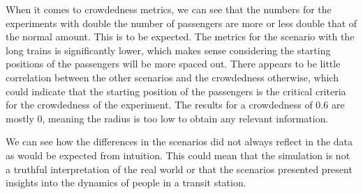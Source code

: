 When it comes to crowdedness metrics, we can see that the numbers for the experiments with double the number of passengers are more or less double that of the normal amount. This is to be expected. The metrics for the scenario with the long trains is significantly lower, which makes sense considering the starting positions of the passengers will be more spaced out. There appears to be little correlation between the other scenarios and the crowdedness otherwise, which could indicate that the starting position of the passengers is the critical criteria for the crowdedness of the experiment. The results for a crowdedness of 0.6 are mostly 0, meaning the radius is too low to obtain any relevant information.

We can see how the differences in the scenarios did not always reflect in the data as would be expected from intuition. This could mean that the simulation is not a truthful interpretation of the real world or that the scenarios presented present insights into the dynamics of people in a transit station.





